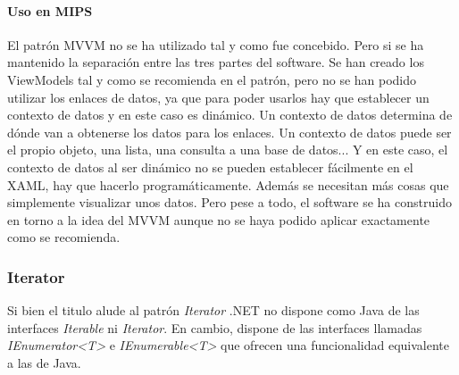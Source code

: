 \paragraph{Uso en MIPS}
El patr\'on MVVM no se ha utilizado tal y como fue concebido. Pero si se ha mantenido la separaci\'on entre
las tres partes del software. Se han creado los ViewModels tal y como se recomienda en el patr\'on, pero no
se han podido utilizar los enlaces de datos, ya que para poder usarlos hay que establecer un contexto de datos
y en este caso es din\'amico. Un contexto de datos determina de d\'onde van a obtenerse los datos para
los enlaces. Un contexto de datos puede ser el propio objeto, una lista, una consulta a una base de datos...
Y en este caso, el contexto de datos al ser din\'amico no se pueden establecer f\'acilmente en el XAML, hay que hacerlo
program\'aticamente. Adem\'as se necesitan m\'as cosas que simplemente visualizar unos datos. Pero
pese a todo, el software se ha construido en torno a la idea del MVVM aunque no se haya podido aplicar exactamente
como se recomienda.

\subsubsection{Iterator}
Si bien el titulo alude al patr\'{o}n \emph{Iterator} .NET no dispone como Java de las interfaces \emph{Iterable} ni
\emph{Iterator}.
En cambio, dispone de las interfaces llamadas \emph{IEnumerator<T>} e \emph{IEnumerable<T>} 
que ofrecen una funcionalidad equivalente a las de Java.


